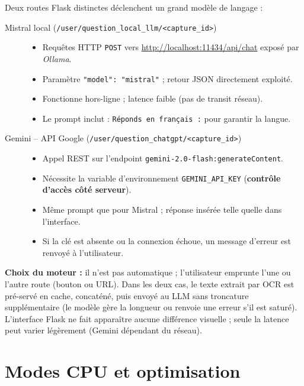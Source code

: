 \documentclass[12pt,a4paper]{report}
\begin{document}
Deux routes Flask distinctes déclenchent un grand modèle de langage :

\begin{description}
  \item[Mistral local (\texttt{/user/question\_local\_llm/\textless capture\_id\textgreater})]%
        \begin{itemize}
          \item Requêtes HTTP \verb|POST| vers \url{http://localhost:11434/api/chat} exposé par \emph{Ollama}.  
          \item Paramètre \verb|"model": "mistral"| ; retour JSON directement exploité.
          \item Fonctionne hors-ligne ; latence faible (pas de transit réseau).  
          \item Le prompt inclut : \verb|Réponds en français :| pour garantir la langue.
        \end{itemize}

  \item[Gemini – API Google (\texttt{/user/question\_chatgpt/\textless capture\_id\textgreater})]%
        \begin{itemize}
          \item Appel REST sur l’endpoint \texttt{gemini-2.0-flash:generateContent}.  
          \item Nécessite la variable d’environnement \verb|GEMINI_API_KEY| (\textbf{contrôle d’accès côté serveur}).  
          \item Même prompt que pour Mistral ; réponse insérée telle quelle dans l’interface.  
          \item Si la clé est absente ou la connexion échoue, un message d’erreur est renvoyé à l’utilisateur.
        \end{itemize}
\end{description}

\textbf{Choix du moteur :} il n’est pas automatique ; l’utilisateur emprunte l’une ou l’autre route (bouton ou URL).  
Dans les deux cas, le texte extrait par OCR est pré-servé en cache, concaténé, puis envoyé au LLM sans troncature supplémentaire (le modèle gère la longueur ou renvoie une erreur s’il est saturé).  
L’interface Flask ne fait apparaître aucune différence visuelle ; seule la latence peut varier légèrement (Gemini dépendant du réseau).%


\section{Modes CPU et optimisation}
\end{document}

